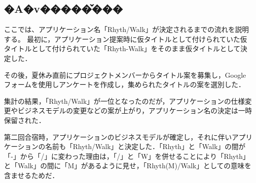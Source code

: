 \subsection{�A�v�����̌���}
ここでは、アプリケーション名「Rhyth/Walk」が決定されるまでの流れを説明する。
最初に，アプリケーション提案時に仮タイトルとして付けられていた仮タイトルとして付けられていた「Rhyth-Walk」をそのまま仮タイトルとして決定した．\par
その後，夏休み直前にプロジェクトメンバーからタイトル案を募集し，Googleフォームを使用しアンケートを作成し，集められたタイトルの案を選別した．\par
集計の結果，「Rhyth/Walk」が一位となったのだが，アプリケーションの仕様変更やビジネスモデルの変更などの案が上がり，アプリケーション名の決定は一時保留された．\par
第二回合宿時，アプリケーションのビジネスモデルが確定し，それに伴いアプリケーションの名前も「Rhyth/Walk」と決定した．「Rhyth」と「Walk」の間が「-」から「/」に変わった理由は，「/」と「W」を併せることにより「Rhyth」と「Walk」の間に「M」があるように見せ，「Rhyth(M)/Walk」としての意味を含ませるためだ．\par
{}
